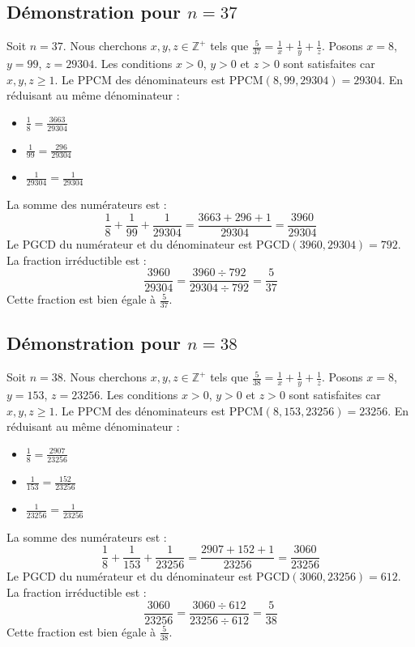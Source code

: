\documentclass[11pt,a4paper]{article}
\begin{document}
\subsection{Démonstration pour $n = 37$}
Soit $n = 37$. Nous cherchons $x, y, z \in \mathbb{Z}^{+}$ tels que $\frac{5}{37} = \frac{1}{x} + \frac{1}{y} + \frac{1}{z}$.
Posons $x = 8$, $y = 99$, $z = 29304$.
Les conditions $x > 0$, $y > 0$ et $z > 0$ sont satisfaites car $x, y, z \geq 1$.
Le PPCM des dénominateurs est $\text{PPCM}(8, 99, 29304) = 29304$.
En réduisant au même dénominateur :
\begin{itemize}
    \item $\frac{1}{8} = \frac{3663}{29304}$
    \item $\frac{1}{99} = \frac{296}{29304}$
    \item $\frac{1}{29304} = \frac{1}{29304}$
\end{itemize}
La somme des numérateurs est :
$$ \frac{1}{8} + \frac{1}{99} + \frac{1}{29304} = \frac{3663 + 296 + 1}{29304} = \frac{3960}{29304} $$
Le PGCD du numérateur et du dénominateur est $\text{PGCD}(3960, 29304) = 792$.
La fraction irréductible est :
$$ \frac{3960}{29304} = \frac{3960 \div 792}{29304 \div 792} = \frac{5}{37} $$
Cette fraction est bien égale à $\frac{5}{37}$.

\subsection{Démonstration pour $n = 38$}
Soit $n = 38$. Nous cherchons $x, y, z \in \mathbb{Z}^{+}$ tels que $\frac{5}{38} = \frac{1}{x} + \frac{1}{y} + \frac{1}{z}$.
Posons $x = 8$, $y = 153$, $z = 23256$.
Les conditions $x > 0$, $y > 0$ et $z > 0$ sont satisfaites car $x, y, z \geq 1$.
Le PPCM des dénominateurs est $\text{PPCM}(8, 153, 23256) = 23256$.
En réduisant au même dénominateur :
\begin{itemize}
    \item $\frac{1}{8} = \frac{2907}{23256}$
    \item $\frac{1}{153} = \frac{152}{23256}$
    \item $\frac{1}{23256} = \frac{1}{23256}$
\end{itemize}
La somme des numérateurs est :
$$ \frac{1}{8} + \frac{1}{153} + \frac{1}{23256} = \frac{2907 + 152 + 1}{23256} = \frac{3060}{23256} $$
Le PGCD du numérateur et du dénominateur est $\text{PGCD}(3060, 23256) = 612$.
La fraction irréductible est :
$$ \frac{3060}{23256} = \frac{3060 \div 612}{23256 \div 612} = \frac{5}{38} $$
Cette fraction est bien égale à $\frac{5}{38}$.
\end{document}
